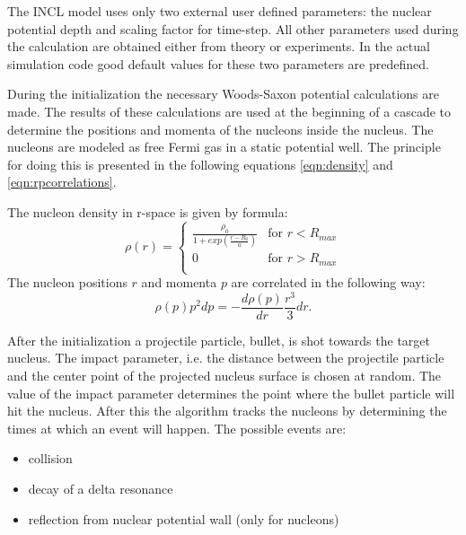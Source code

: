 The INCL model uses only two external user defined parameters: the nuclear
potential depth and scaling factor for time-step. All other parameters
used during the calculation are obtained either from theory or
experiments. In the actual simulation code good default values for
these two parameters are predefined.

During the initialization the necessary Woods-Saxon potential
calculations are made. The results of these calculations are used at
the beginning of a cascade to determine the positions and momenta of
the nucleons inside the nucleus. The nucleons are modeled as free
Fermi gas in a static potential well. The principle for doing this is
presented in the following equations \ref{eqn:density} and
\ref{eqn:rpcorrelations}.

The nucleon density in r-space is given by formula:
\begin{equation}
\rho(r) =  \left\{ \begin{array}{ll}
  \frac{\rho_0}{1 + exp(\frac{r - R_0}{a})}& \textrm{for $r
   < R_{max}$}\\
 0 & \textrm{for $r > R_{max}$}\\
  \end{array} \right.
\label{eqn:density}
\end{equation}
The nucleon positions $r$ and momenta $p$ are correlated in the following way:
\begin{equation}
\rho(p)p^2dp = -\frac{d \rho(p)}{dr} \frac{r^3}{3}dr.
\label{eqn:rpcorrelations}
\end{equation}


After the initialization a projectile particle, bullet, is shot
towards the target nucleus. The impact parameter, i.e. the distance
between the projectile particle and the center point of the projected
nucleus surface is chosen at random. The value of the impact parameter
determines the point where the bullet particle will hit the
nucleus. After this the algorithm tracks the nucleons by determining
the times at which an event will happen. The possible events are:
\begin{itemize}
\item collision
\item decay of a delta resonance
\item reflection from nuclear potential wall (only for nucleons)
\end{itemize}

